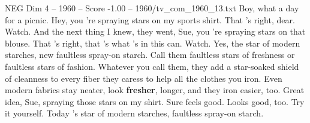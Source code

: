 \begin{textsample}{NEG Dim 4 – 1960 – Score -1.00 – 1960/tv\_com\_1960\_13.txt}  \label{ex:f4_neg_087}
Boy, what a day for a picnic.
Hey, you 're spraying stars on my sports shirt.
That 's right, dear.
Watch.
And the next thing I knew, they went, Sue, you 're spraying stars on that blouse.
That 's right, that 's what 's in this can.
Watch.
Yes, the star of modern starches, new faultless spray-on starch.
Call them faultless stars of freshness or faultless stars of fashion.
Whatever you call them, they add a star-soaked shield of cleanness to every fiber they caress to help all the clothes you iron.
Even modern fabrics stay neater, look \textbf{fresher}, longer, and they iron easier, too.
Great idea, Sue, spraying those stars on my shirt.
Sure feels good.
Looks good, too.
Try it yourself.
Today 's star of modern starches, faultless spray-on starch.

\end{textsample}
